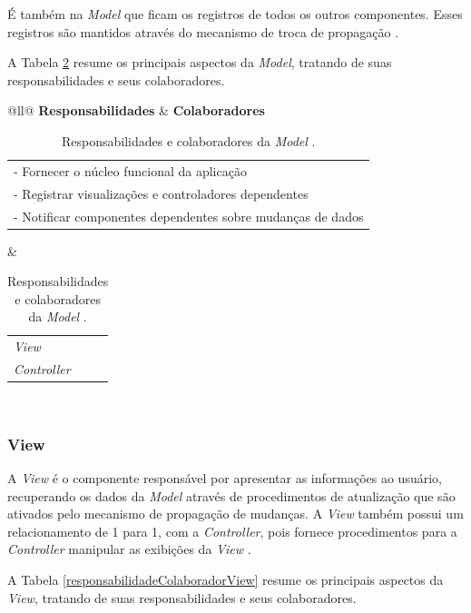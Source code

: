 É também na \textit{Model} que ficam os registros de todos os outros componentes. Esses registros são mantidos através do mecanismo de troca de propagação \cite{buschmann1996system}. 

A Tabela \ref{responsabilidadeColaboradorModel} resume os principais aspectos da \textit{Model}, tratando de suas responsabilidades e seus colaboradores. 

\begin{table}[h!]
	\centering
	\caption{Responsabilidades e colaboradores da \textit{Model} \cite{buschmann1996system}.}
	\label{responsabilidadeColaboradorModel}
	\begin{tabular}{@{}ll@{}}
		\hline
		\textbf{Responsabilidades} &   \textbf{Colaboradores} \\ \hline
		\begin{tabular}[c]{@{}l@{}}- Fornecer o núcleo funcional da aplicação\\ - Registrar visualizações e controladores dependentes\\ - Notificar componentes dependentes sobre mudanças de dados\end{tabular} & \begin{tabular}[c]{@{}l@{}}\textit{View}\\ \textit{Controller}\end{tabular} \\ \hline
	\end{tabular}
\end{table}

\subsubsection{View}

A \textit{View} é o componente responsável por apresentar as informações ao usuário, recuperando os dados da \textit{Model} através de procedimentos de atualização que são ativados pelo mecanismo de propagação de mudanças. A \textit{View} também possui um relacionamento de 1 para 1, com a \textit{Controller}, pois fornece procedimentos para a \textit{Controller} manipular as exibições da \textit{View} \cite{buschmann1996system}.

A Tabela \ref{responsabilidadeColaboradorView} resume os principais aspectos da \textit{View}, tratando de suas responsabilidades e seus colaboradores. 

